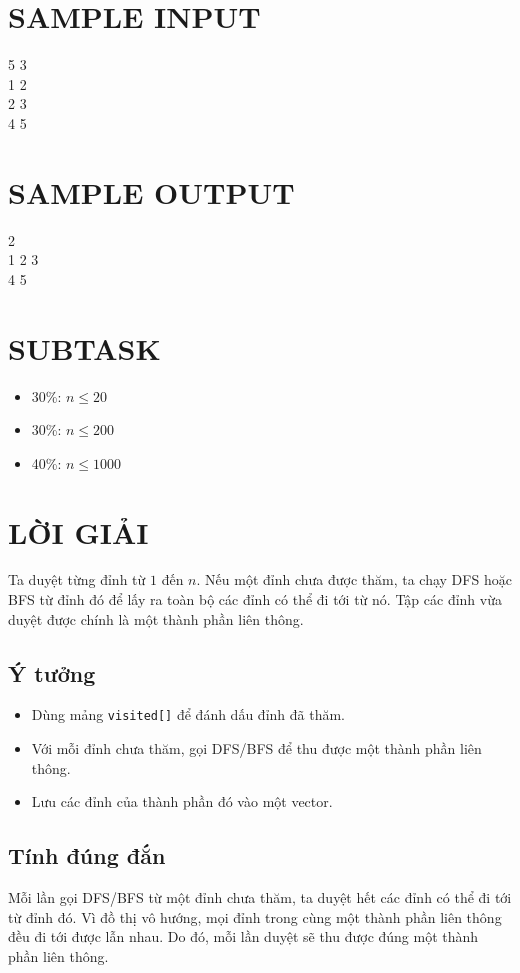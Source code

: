 \documentclass[a4paper,12pt]{article}
\begin{document}
\section*{SAMPLE INPUT}
\begin{tcolorbox}
5 3 \\
1 2 \\
2 3 \\
4 5
\end{tcolorbox}

\section*{SAMPLE OUTPUT}
\begin{tcolorbox}
2 \\
1 2 3 \\
4 5
\end{tcolorbox}

\section*{SUBTASK}
\begin{itemize}
    \item 30\%: $n \le 20$
    \item 30\%: $n \le 200$
    \item 40\%: $n \le 1000$
\end{itemize}

\section*{LỜI GIẢI}

Ta duyệt từng đỉnh từ $1$ đến $n$. Nếu một đỉnh chưa được thăm, ta chạy DFS hoặc BFS từ đỉnh đó để lấy ra toàn bộ các đỉnh có thể đi tới từ nó. Tập các đỉnh vừa duyệt được chính là một thành phần liên thông.

\subsection*{Ý tưởng}
\begin{itemize}
    \item Dùng mảng \texttt{visited[]} để đánh dấu đỉnh đã thăm.
    \item Với mỗi đỉnh chưa thăm, gọi DFS/BFS để thu được một thành phần liên thông.
    \item Lưu các đỉnh của thành phần đó vào một vector.
\end{itemize}

\subsection*{Tính đúng đắn}
Mỗi lần gọi DFS/BFS từ một đỉnh chưa thăm, ta duyệt hết các đỉnh có thể đi tới từ đỉnh đó. Vì đồ thị vô hướng, mọi đỉnh trong cùng một thành phần liên thông đều đi tới được lẫn nhau. Do đó, mỗi lần duyệt sẽ thu được đúng một thành phần liên thông.
\end{document}
